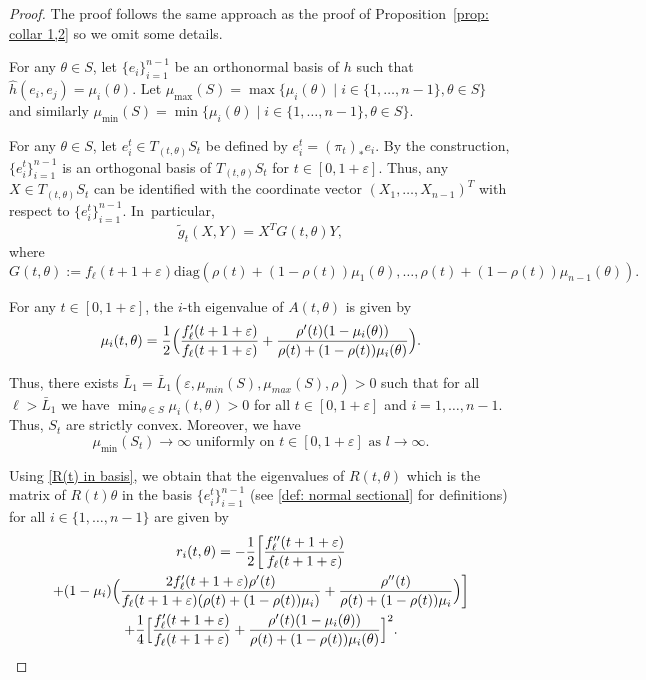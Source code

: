 \documentclass[10pt]{amsart}
\let\sep\mid
\theoremstyle{definition}
\let\eps\varepsilon
\renewcommand{\>}{{\rangle}}
\newcommand{\<}{{\langle}}
\begin{document}
\begin{proof}
The proof follows the same approach as the proof of Proposition~\ref{prop: collar 1,2} so we omit some details.

For any $\theta\in S$, let $\{e_i\}_{i=1}^{n-1}$ be an orthonormal basis of $h$ such that $\hat h(e_i,e_j)=\mu_i(\theta)$. Let $\mu_{\max}(S) = \max\{\mu_i(\theta)\sep i\in\{1,\ldots, n-1\}, \theta\in S\}$ and similarly $\mu_{\min}(S) = \min\{\mu_i(\theta)\sep i\in\{1,\ldots, n-1\}, \theta\in S\}$.

For any $\theta\in S$, let $e_i^t\in T_{(t,\theta)}S_t$ be defined by $e_i^t = (\pi_t)_{*}e_i.$ By the construction, $\{e_i^t\}_{i=1}^{n-1}$ is an orthogonal basis of $T_{(t,\theta)}S_t$ for $t\in[0,1+\eps]$. Thus, any $X\in T_{(t,\theta)}S_t$ can be identified with the coordinate vector $(X_1,\ldots,X_{n-1})^T$ with respect to $\{e_i^t\}_{i=1}^{n-1}$. In~particular,\vspace*{-3pt}
\begin{equation*}
\tilde g_t(X,Y) = X^TG(t,\theta)Y,
\end{equation*}
where\vspace*{-3pt}
\begin{equation*}
G(t,\theta):=f_\ell(t+1+\eps)\text{diag}(\rho(t)+(1-\rho(t))\mu_1(\theta),\dots, \rho(t)+(1-\rho(t))\mu_{n-1}(\theta)).
\end{equation*}

For any $t\in[0,1+\eps]$, the $i$-th eigenvalue of $A(t,\theta)$ is given by
\begin{equation*}
\mu_i(t,\theta) = \frac{1}{2}\Bigl(\frac{f_\ell'(t+1+\eps)}{f_\ell(t+1+\eps)}+\frac{\rho'(t)(1-\mu_i(\theta))}{\rho(t)+(1-\rho(t))\mu_i(\theta)} \Bigr).
\end{equation*}

Thus, there exists $\bar L_1=\bar L_1(\eps, \mu_{min}(S), \mu_{max}(S), \rho)>0$ such that for all $\ell>\bar L_1$ we have $\min_{\theta\in S}\mu_i(t,\theta)>0$ for all $t\in[0,1+\eps]$ and $i=1,\ldots, n-1$. Thus, $S_t$ are strictly convex. Moreover, we have
\begin{equation}\label{unif_increase_mu_i}
\mu_{\min}(S_t) \to \infty \text{ uniformly on } t\in[0,1+\eps] \text{ as } l\to\infty.
\end{equation}

Using \eqref{R(t) in basis}, we obtain that the eigenvalues of $R(t,\theta)$ which is the matrix of $R(t)\theta$ in the basis $\{e_i^t\}_{i=1}^{n-1}$ (see \eqref{def: normal sectional} for definitions) for all $i\in\{1,\ldots, n-1\}$ are given by\vspace*{-3pt}
\begin{multline*}\label{eigenvalues of R(t) 2}
r_i(t,\theta)
=-\frac{1}{2}\biggl[\frac{f''_\ell(t+1+\eps)}{f_\ell(t+1+\eps)}\\
+(1-\mu_i) \Bigl(\frac{2f'_\ell(t+1+\eps)\rho'(t)}{f_\ell(t+1+\eps)(\rho(t)+(1-\rho(t))\mu_i)}+\frac{\rho''(t)}{\rho(t)+(1-\rho(t))\mu_i} \Bigr)\biggr]\\
+\frac{1}{4} \Bigl[\frac{f_\ell'(t+1+\eps)}{f_\ell(t+1+\eps)}+\frac{\rho'(t)(1-\mu_i(\theta))}{\rho(t)+(1-\rho(t))\mu_i(\theta)} \Bigr]^2.
\end{multline*}


\end{proof}
\end{document}
